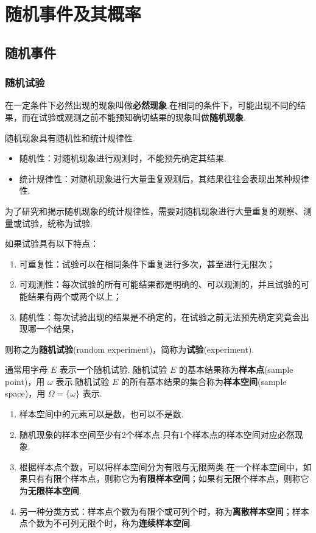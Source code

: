 
\chapter{随机事件及其概率}
\thispagestyle{plain}

\section{随机事件}

\subsection{随机试验}

在一定条件下必然出现的现象叫做\textbf{必然现象}.在相同的条件下，可能出现不同的结果，而在试验或观测之前不能预知确切结果的现象叫做\textbf{随机现象}.

随机现象具有随机性和统计规律性.

\begin{itemize}
    \item 随机性：对随机现象进行观测时，不能预先确定其结果.
    \item 统计规律性：对随机现象进行大量重复观测后，其结果往往会表现出某种规律性.
\end{itemize}

为了研究和揭示随机现象的统计规律性，需要对随机现象进行大量重复的观察、测量或试验，统称为试验.

如果试验具有以下特点：
\begin{enumerate}
    \item 可重复性：试验可以在相同条件下重复进行多次，甚至进行无限次；
    \item 可观测性：每次试验的所有可能结果都是明确的、可以观测的，并且试验的可能结果有两个或两个以上；
    \item 随机性：每次试验出现的结果是不确定的，在试验之前无法预先确定究竟会出现哪一个结果，
\end{enumerate}
则称之为\textbf{随机试验}(random experiment)，简称为\textbf{试验}(experiment).

通常用字母 $E$ 表示一个随机试验. 随机试验 $E$ 的基本结果称为\textbf{样本点}(sample point)，用 $\omega$ 表示.随机试验 $E$ 的所有基本结果的集合称为\textbf{样本空间}(sample space)，用 $\varOmega = \{ \omega \}$ 表示.

\begin{note}
    \begin{enumerate}
        \item 样本空间中的元素可以是数，也可以不是数.
        \item 随机现象的样本空间至少有2个样本点.只有1个样本点的样本空间对应必然现象.
        \item 根据样本点个数，可以将样本空间分为有限与无限两类.在一个样本空间中，如果只有有限个样本点，则称它为\textbf{有限样本空间}；如果有无限个样本点，则称它为\textbf{无限样本空间}.
        \item 另一种分类方式：样本点个数为有限个或可列个时，称为\textbf{离散样本空间}；样本点个数为不可列无限个时，称为\textbf{连续样本空间}.
    \end{enumerate}
\end{note}

